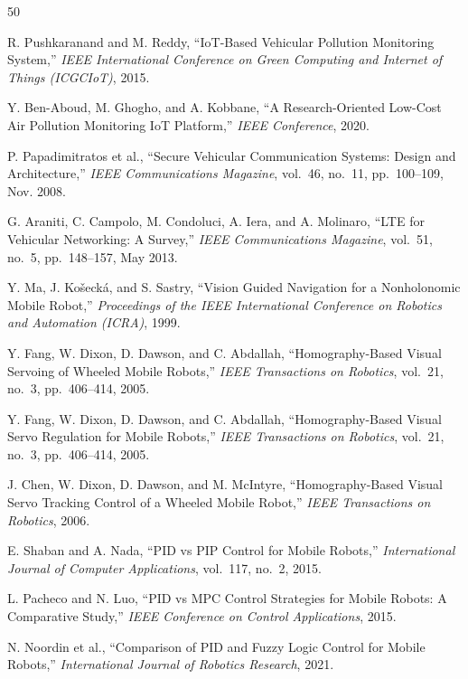 \newpage
\renewcommand{\bibname}{References}

\begin{thebibliography}{50}

R. Pushkaranand and M. Reddy,
``IoT-Based Vehicular Pollution Monitoring System,''
\textit{IEEE International Conference on Green Computing and Internet of Things (ICGCIoT)},
2015.

Y. Ben-Aboud, M. Ghogho, and A. Kobbane,
``A Research-Oriented Low-Cost Air Pollution Monitoring IoT Platform,''
\textit{IEEE Conference},
2020.

P. Papadimitratos et al.,
``Secure Vehicular Communication Systems: Design and Architecture,''
\textit{IEEE Communications Magazine},
vol.~46, no.~11, pp.~100--109, Nov. 2008.

G. Araniti, C. Campolo, M. Condoluci, A. Iera, and A. Molinaro,
``LTE for Vehicular Networking: A Survey,''
\textit{IEEE Communications Magazine},
vol.~51, no.~5, pp.~148--157, May 2013.

Y. Ma, J. Ko\v{s}eck\'{a}, and S. Sastry,
``Vision Guided Navigation for a Nonholonomic Mobile Robot,''
\textit{Proceedings of the IEEE International Conference on Robotics and Automation (ICRA)},
1999.

Y. Fang, W. Dixon, D. Dawson, and C. Abdallah,
``Homography-Based Visual Servoing of Wheeled Mobile Robots,''
\textit{IEEE Transactions on Robotics},
vol.~21, no.~3, pp.~406--414, 2005.

Y. Fang, W. Dixon, D. Dawson, and C. Abdallah,
``Homography-Based Visual Servo Regulation for Mobile Robots,''
\textit{IEEE Transactions on Robotics},
vol.~21, no.~3, pp.~406--414, 2005.

J. Chen, W. Dixon, D. Dawson, and M. McIntyre,
``Homography-Based Visual Servo Tracking Control of a Wheeled Mobile Robot,''
\textit{IEEE Transactions on Robotics},
2006.

E. Shaban and A. Nada,
``PID vs PIP Control for Mobile Robots,''
\textit{International Journal of Computer Applications},
vol.~117, no.~2, 2015.

L. Pacheco and N. Luo,
``PID vs MPC Control Strategies for Mobile Robots: A Comparative Study,''
\textit{IEEE Conference on Control Applications},
2015.

N. Noordin et al.,
``Comparison of PID and Fuzzy Logic Control for Mobile Robots,''
\textit{International Journal of Robotics Research},
2021.


\end{thebibliography}
